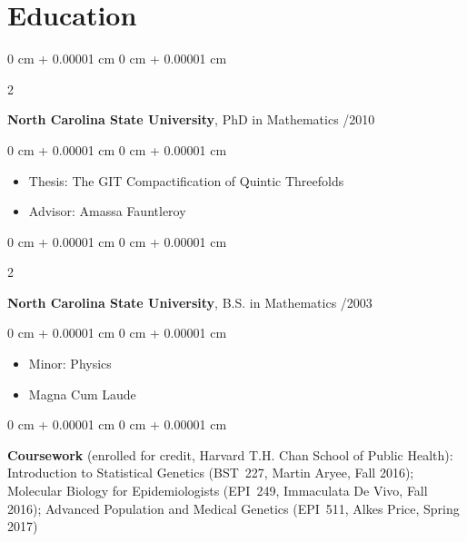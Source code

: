 \documentclass[10pt, letterpaper]{article}
\newenvironment{highlights}{
    \begin{itemize}[
        topsep=0.10 cm,
        parsep=0.10 cm,
        partopsep=0pt,
        itemsep=0pt,
        leftmargin=0 cm + 10pt
    ]
}{
    \end{itemize}
} %
\newenvironment{onecolentry}{
    \begin{adjustwidth}{
        0 cm + 0.00001 cm
    }{
        0 cm + 0.00001 cm
    }
}{
    \end{adjustwidth}
} %
\newenvironment{twocolentry}[2][]{
    \onecolentry
    \def\secondColumn{#2}
    \setcolumnwidth{\fill, 4.5 cm}
    \begin{paracol}{2}
}{
    \switchcolumn \raggedleft \secondColumn
    \end{paracol}
    \endonecolentry
} %
\begin{document}
\section{Education}




        \begin{twocolentry}{
            12/2010
        }
            \textbf{North Carolina State University}, PhD in Mathematics\end{twocolentry}

        \vspace{0.10 cm}
        \begin{onecolentry}
            \begin{highlights}
                \item Thesis: The GIT Compactification of Quintic Threefolds
                \item Advisor: Amassa Fauntleroy
            \end{highlights}
        \end{onecolentry}


        \vspace{0.20 cm}




        \begin{twocolentry}{
            12/2003
        }
            \textbf{North Carolina State University}, B.S. in Mathematics \end{twocolentry}

        \vspace{0.10 cm}
        \begin{onecolentry}
            \begin{highlights}
                \item Minor: Physics
                \item Magna Cum Laude
            \end{highlights}
        \end{onecolentry}

        \vspace{0.20 cm}

        \begin{onecolentry}
            \textbf{Coursework} (enrolled for credit, Harvard T.H. Chan School of Public Health): Introduction to Statistical Genetics (BST~227, Martin Aryee, Fall 2016); Molecular Biology for Epidemiologists (EPI~249, Immaculata De Vivo, Fall 2016); Advanced Population and Medical Genetics (EPI~511, Alkes Price, Spring 2017)
        \end{onecolentry}
\end{document}
